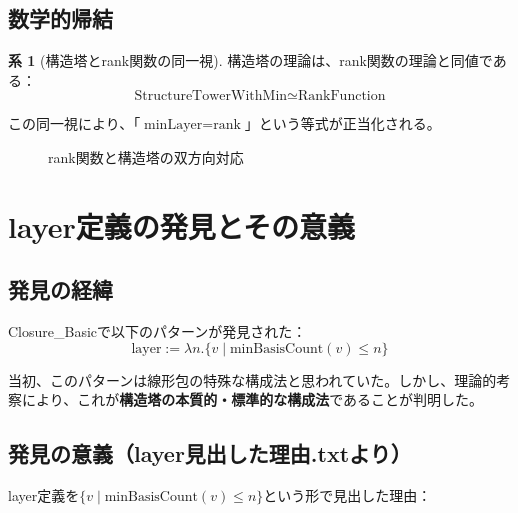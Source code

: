 \documentclass[a4paper,12pt]{ltjsarticle}
\theoremstyle{definition}
\newtheorem{corollary}[definition]{系}
\begin{document}
\subsection{数学的帰結}

\begin{corollary}[構造塔とrank関数の同一視]
構造塔の理論は、rank関数の理論と同値である：
$$\text{StructureTowerWithMin} \simeq \text{RankFunction}$$
\end{corollary}

この同一視により、「$\text{minLayer} = \text{rank}$」という等式が正当化される。

\begin{figure}[h]
\centering
{}
\caption{rank関数と構造塔の双方向対応}
\end{figure}

\section{layer定義の発見とその意義}\label{sec:layer_discovery}

\subsection{発見の経緯}

Closure\_Basicで以下のパターンが発見された：
$$\text{layer} := \lambda n. \{v \mid \text{minBasisCount}(v) \leq n\}$$

当初、このパターンは線形包の特殊な構成法と思われていた。しかし、理論的考察により、これが\textbf{構造塔の本質的・標準的な構成法}であることが判明した。

\subsection{発見の意義（layer見出した理由.txtより）}

layer定義を$\{v \mid \text{minBasisCount}(v) \leq n\}$という形で見出した理由：
\end{document}
